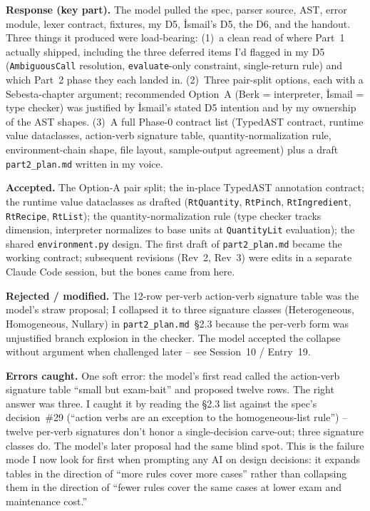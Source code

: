 \documentclass[11pt,a4paper]{article}
\newcommand{\field}[1]{\noindent\textbf{#1}}
\begin{document}
\field{Response (key part).} The model pulled the spec, parser source,
AST, error module, lexer contract, fixtures, my D5, İsmail's D5, the
D6, and the handout. Three things it produced were load-bearing: (1)~a
clean read of where Part~1 actually shipped, including the three
deferred items I'd flagged in my D5 (\texttt{AmbiguousCall} resolution,
\texttt{evaluate}-only constraint, single-return rule) and which Part~2
phase they each landed in. (2)~Three pair-split options, each with a
Sebesta-chapter argument; recommended Option~A (Berk = interpreter,
İsmail = type checker) was justified by İsmail's stated D5 intention
and by my ownership of the AST shapes. (3)~A full Phase-0 contract list
(TypedAST contract, runtime value dataclasses, action-verb signature
table, quantity-normalization rule, environment-chain shape, file
layout, sample-output agreement) plus a draft \texttt{part2\_plan.md}
written in my voice.

\field{Accepted.} The Option-A pair split; the in-place TypedAST
annotation contract; the runtime value dataclasses as drafted
(\texttt{RtQuantity}, \texttt{RtPinch}, \texttt{RtIngredient},
\texttt{RtRecipe}, \texttt{RtList}); the quantity-normalization rule
(type checker tracks dimension, interpreter normalizes to base units
at \texttt{QuantityLit} evaluation); the shared \texttt{environment.py}
design. The first draft of \texttt{part2\_plan.md} became the working
contract; subsequent revisions (Rev~2, Rev~3) were edits in a separate
Claude Code session, but the bones came from here.

\field{Rejected / modified.} The 12-row per-verb action-verb signature
table was the model's straw proposal; I collapsed it to three signature
classes (Heterogeneous, Homogeneous, Nullary) in
\texttt{part2\_plan.md}~\S2.3 because the per-verb form was unjustified
branch explosion in the checker. The model accepted the collapse
without argument when challenged later -- see Session~10 / Entry~19.

\field{Errors caught.} One soft error: the model's first read called
the action-verb signature table ``small but exam-bait'' and proposed
twelve rows. The right answer was three. I caught it by reading the
\S2.3 list against the spec's decision~\#29 (``action verbs are an
exception to the homogeneous-list rule'') -- twelve per-verb
signatures don't honor a single-decision carve-out; three signature
classes do. The model's later proposal had the same blind spot. This
is the failure mode I now look for first when prompting any AI on
design decisions: it expands tables in the direction of ``more rules
cover more cases'' rather than collapsing them in the direction of
``fewer rules cover the same cases at lower exam and maintenance
cost.''
\end{document}
